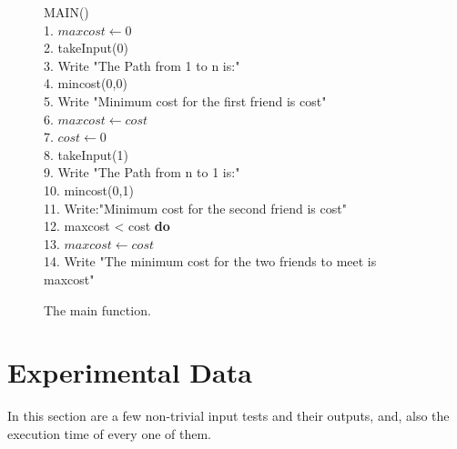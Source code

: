 \documentclass{article}
\begin{document}
     \begin{figure}
\begin{center}
\begin{tabbing}
  {MAIN}() \\
1. \indent $maxcost \leftarrow 0$ \\
2. \indent  takeInput(0) \\
3. \indent  Write "The Path from 1 to n is:"\\
4. \indent mincost(0,0) \\
5. \indent  Write "Minimum cost for the first friend is cost"\\
6. \indent $maxcost \leftarrow cost$ \\
7. \indent $cost \leftarrow 0$ \\
8. \indent  takeInput(1) \\
9. \indent  Write "The Path from n to 1 is:"\\
10. \indent mincost(0,1) \\
11. \indent Write:"Minimum cost for the second friend is cost"\\
12.  maxcost < cost {\bf do}\\
13. \indent $maxcost \leftarrow cost$ \\
14. \indent Write "The minimum cost for the two friends to meet is maxcost" \\
\end{tabbing}
\caption{The main function.}
\label{fig_alg_ex4}

\end{center}
\end{figure}

    \pagebreak
\section{Experimental Data}

In this section are a few non-trivial input tests and their outputs, and, also the execution time of every one of them.  
\end{document}
